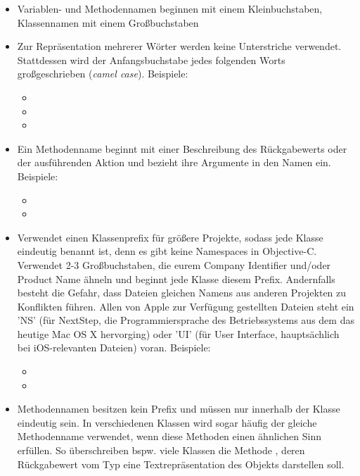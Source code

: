 \documentclass[parskip=half, final]{scrreprt}
\begin{document}
\begin{itemize}
\item Variablen- und Methodennamen beginnen mit einem Kleinbuchstaben, Klassennamen mit einem Großbuchstaben
\item Zur Repräsentation mehrerer Wörter werden keine Unterstriche verwendet. Stattdessen wird der Anfangsbuchstabe jedes folgenden Worts großgeschrieben (\emph{camel case}). Beispiele:
\begin{itemize}
\item {}
\item {}
\item {}
\end{itemize}
\item Ein Methodenname beginnt mit einer Beschreibung des Rückgabewerts oder der ausführenden Aktion und bezieht ihre Argumente in den Namen ein. Beispiele:
\begin{itemize}
\item {}
\item {}
\end{itemize}
\item Verwendet einen Klassenprefix für größere Projekte, sodass jede Klasse eindeutig benannt ist, denn es gibt keine Namespaces in Objective-C. Verwendet 2-3 Großbuchstaben, die eurem Company Identifier und/oder Product Name ähneln und beginnt jede Klasse diesem Prefix. Andernfalls besteht die Gefahr, dass Dateien gleichen Namens aus anderen Projekten zu Konflikten führen. Allen von Apple zur Verfügung gestellten Dateien steht ein 'NS' (für NextStep, die Programmiersprache des Betriebssystems aus dem das heutige Mac OS X hervorging) oder 'UI' (für User Interface, hauptsächlich bei iOS-relevanten Dateien) voran. Beispiele:
\begin{itemize}
\item {}
\item {}
\end{itemize}
\item Methodennamen besitzen kein Prefix und müssen nur innerhalb der Klasse eindeutig sein. In verschiedenen Klassen wird sogar häufig der gleiche Methodenname verwendet, wenn diese Methoden einen ähnlichen Sinn erfüllen. So überschreiben bspw. viele Klassen die Methode , deren Rückgabewert vom Typ  eine Textrepräsentation des Objekts darstellen soll.

\end{itemize}
\end{document}
